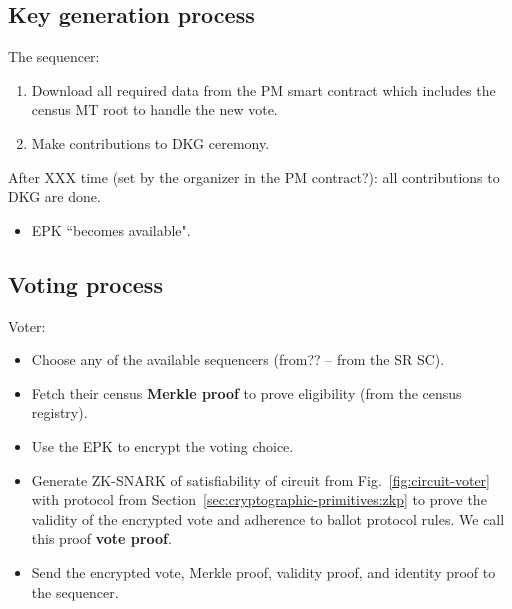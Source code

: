 \subsection{Key generation process} %
\label{sec:vocdoni-protocol:dkg}

The sequencer:
\begin{enumerate}
	\item Download all required data from the PM smart contract which includes the census MT root to handle the new vote.
	\item Make contributions to DKG ceremony.
\end{enumerate}

After XXX time (set by the organizer in the PM contract?): all contributions to DKG are done.

	
\begin{itemize}
	\item EPK ``becomes available".
\end{itemize}

\subsection{Voting process}
\label{sec:vocdoni-protocol:voting}

Voter:

\begin{itemize}
	\item Choose any of the available sequencers (from?? -- from the SR SC).
	\item Fetch their census \textbf{Merkle proof} to prove eligibility (from the census registry).
	\item Use the EPK to encrypt the voting choice.
	\item Generate ZK-SNARK of satisfiability of circuit from Fig.~\ref{fig:circuit-voter} with protocol from Section~\ref{sec:cryptographic-primitives:zkp} to prove the validity of the encrypted vote and adherence to ballot protocol rules. We call this proof \textbf{vote proof}.
	\item Send the encrypted vote, Merkle proof, validity proof, and identity proof to the sequencer.
\end{itemize}

